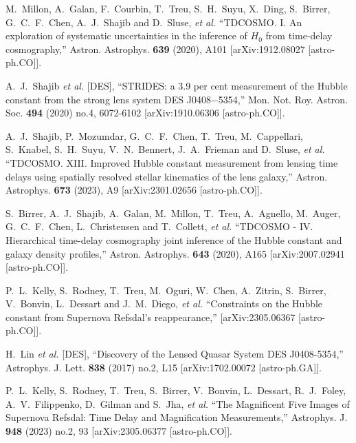 \documentclass[aps,prl,10pt,twocolumn,superscriptaddress, nofootinbib]{revtex4}
\begin{document}
\begin{thebibliography}{99}
M.~Millon, A.~Galan, F.~Courbin, T.~Treu, S.~H.~Suyu, X.~Ding, S.~Birrer, G.~C.~F.~Chen, A.~J.~Shajib and D.~Sluse, \textit{et al.}
``TDCOSMO. I. An exploration of systematic uncertainties in the inference of $H_0$ from time-delay cosmography,''
Astron. Astrophys. \textbf{639} (2020), A101
[arXiv:1912.08027 [astro-ph.CO]].

A.~J.~Shajib \textit{et al.} [DES],
``STRIDES: a 3.9 per cent measurement of the Hubble constant from the strong lens system DES J0408\ensuremath{-}5354,''
Mon. Not. Roy. Astron. Soc. \textbf{494} (2020) no.4, 6072-6102
[arXiv:1910.06306 [astro-ph.CO]].

A.~J.~Shajib, P.~Mozumdar, G.~C.~F.~Chen, T.~Treu, M.~Cappellari, S.~Knabel, S.~H.~Suyu, V.~N.~Bennert, J.~A.~Frieman and D.~Sluse, \textit{et al.}
``TDCOSMO. XIII. Improved Hubble constant measurement from lensing time delays using spatially resolved stellar kinematics of the lens galaxy,''
Astron. Astrophys. \textbf{673} (2023), A9
[arXiv:2301.02656 [astro-ph.CO]].

S.~Birrer, A.~J.~Shajib, A.~Galan, M.~Millon, T.~Treu, A.~Agnello, M.~Auger, G.~C.~F.~Chen, L.~Christensen and T.~Collett, \textit{et al.}
``TDCOSMO - IV. Hierarchical time-delay cosmography \textendash{} joint inference of the Hubble constant and galaxy density profiles,''
Astron. Astrophys. \textbf{643} (2020), A165
[arXiv:2007.02941 [astro-ph.CO]].

P.~L.~Kelly, S.~Rodney, T.~Treu, M.~Oguri, W.~Chen, A.~Zitrin, S.~Birrer, V.~Bonvin, L.~Dessart and J.~M.~Diego, \textit{et al.}
``Constraints on the Hubble constant from Supernova Refsdal's reappearance,''
[arXiv:2305.06367 [astro-ph.CO]].

H.~Lin \textit{et al.} [DES],
``Discovery of the Lensed Quasar System DES J0408-5354,''
Astrophys. J. Lett. \textbf{838} (2017) no.2, L15
[arXiv:1702.00072 [astro-ph.GA]].

P.~L.~Kelly, S.~Rodney, T.~Treu, S.~Birrer, V.~Bonvin, L.~Dessart, R.~J.~Foley, A.~V.~Filippenko, D.~Gilman and S.~Jha, \textit{et al.}
``The Magnificent Five Images of Supernova Refsdal: Time Delay and Magnification Measurements,''
Astrophys. J. \textbf{948} (2023) no.2, 93
[arXiv:2305.06377 [astro-ph.CO]].


\end{thebibliography}
\end{document}
